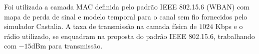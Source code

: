 Foi utilizada a camada MAC definida pelo padrão IEEE 802.15.6 (WBAN) \cite{b5} com mapa de perda de sinal e modelo temporal para o canal sem fio fornecidos pelo simulador Castalia. A taxa de transmissão na camada física de $1024$ Kbps e o rádio utilizado, se enquadram na proposta do padrão IEEE 802.15.6, trabalhando com $-15$dBm para transmissão.


